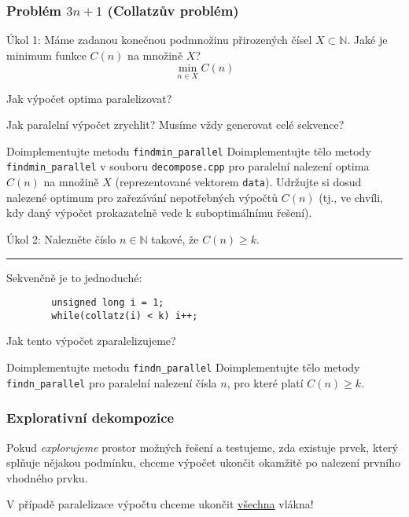 \documentclass[usenames,dvipsnames,9pt]{beamer}
\begin{document}
{
\begin{frame}[fragile]
	\frametitle{Problém $3n+1$ (Collatzův problém)}
	Úkol 1: Máme zadanou konečnou podmnožinu přirozených čísel $X \subset \mathbb{N}$. Jaké je minimum funkce $C(n)$ na množině $X$?
	\[ \min_{n \in X} C(n) \]
	\pause
  \begin{center}
    \Large Jak výpočet optima paralelizovat?
  \end{center}
  \pause
  \begin{center}
    {\Large Jak paralelní výpočet zrychlit?}
    Musíme vždy generovat celé sekvence?
  \end{center}

  \pause
  \begin{block}{Doimplementujte metodu \texttt{findmin\_parallel}}
    Doimplementujte tělo metody \texttt{findmin\_parallel} v souboru \texttt{decompose.cpp} pro paralelní nalezení optima $C(n)$ na množině $X$ (reprezentované vektorem \texttt{data}).
    Udržujte si dosud nalezené optimum pro zařezávání nepotřebných výpočtů $C(n)$ (tj., ve chvíli, kdy daný výpočet prokazatelně vede k suboptimálnímu řešení).
  \end{block}
\end{frame}

\begin{frame}[fragile]
	Úkol 2: Nalezněte číslo $n \in \mathbb{N}$ takové, že $C(n) \geq k$.

	\pause
	\vspace{1em}\hrule\vspace{1em}
	Sekvenčně je to jednoduché:
	\begin{verbatim}
		unsigned long i = 1;
		while(collatz(i) < k) i++;
	\end{verbatim}
	\begin{center}
		\Large Jak tento výpočet zparalelizujeme?
	\end{center}

	\pause
	\begin{block}{Doimplementujte metodu \texttt{findn\_parallel}}
		Doimplementujte tělo metody \texttt{findn\_parallel} pro paralelní nalezení čísla $n$, pro které platí $C(n) \geq k$.
	\end{block}
\end{frame}
}

\begin{frame}
	\frametitle{Explorativní dekompozice}
	\faWarning \hspace{3pt}
	Pokud \emph{explorujeme} prostor možných řešení a testujeme, zda existuje prvek, který splňuje nějakou podmínku, chceme výpočet ukončit okamžitě po nalezení prvního vhodného prvku.

	\pause
	\vspace{0.5em}
	\hfill V případě paralelizace výpočtu chceme ukončit \underline{všechna} vlákna!
\end{frame}
\end{document}
